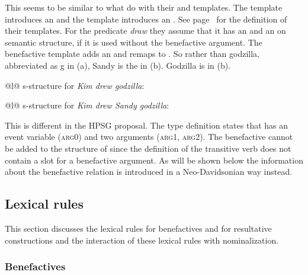 This seems to be similar to what \citet{AGT2014a} do with their
 and  templates. The  template introduces an
\argone and the  template introduces an \argtwo. See page~\pageref{ex:agent-temp} for the
definition of their templates. For the predicate \emph{draw} they assume that it has an \argone and
an \argtwo on semantic structure, if it is used without the benefactive argument. The benefactive
template adds an \argthree and remaps \argtwo to \argthree. So rather than godzilla, abbreviated as
g in (a), Sandy is the \argtwo in (b). Godzilla is \argthree in (b).
\eal
\ex 
\begin{tabular}[t]{@{}l@{}}
s-structure for \emph{Kim drew godzilla}:\\ 
\end{tabular}
\ex
\begin{tabular}[t]{@{}l@{}}
s-structure for \emph{Kim drew Sandy godzilla}:\\
\end{tabular}
\zl
This is different in the HPSG proposal. The type definition states that  has an event
variable (\textsc{arg0}) and two arguments (\textsc{arg1}, \textsc{arg2}). The benefactive cannot be added to the
structure of  since the definition of the transitive verb  does not contain a slot for a benefactive argument. As will be shown below
the information about the benefactive relation is introduced in a Neo-Davidsonian way instead.   

\subsection{Lexical rules}

This section discusses the lexical rules for benefactives and for resultative constructions and the
interaction of these lexical rules with nominalization.

\subsubsection{Benefactives}


